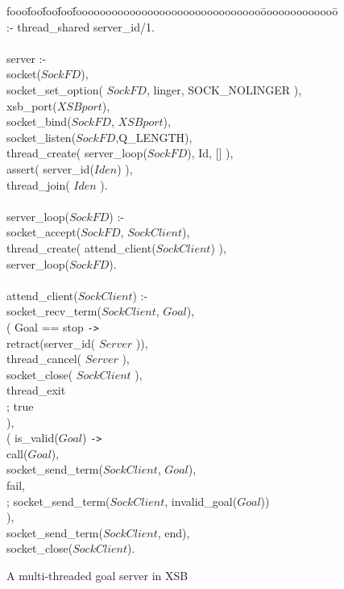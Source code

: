 \begin{figure}
\begin{center}
\begin{tt}
\begin{tabbing}
fooo\=foo\=foo\=foo\=fooooooooooooooooooooooooooooooo\=ooooooooooooo\=\kill
\> :- thread\_shared server\_id/1. \\
\\
\> server :-\\
\> \> socket($SockFD$),\\
\> \> socket\_set\_option( $SockFD$, linger, SOCK\_NOLINGER ),\\
\> \> xsb\_port($XSBport$),\\
\> \> socket\_bind($SockFD$, $XSBport$),\\
\> \> socket\_listen($SockFD$,Q\_LENGTH),\\
\> \> thread\_create( server\_loop($SockFD$), Id, [] ),\\
\> \> assert( server\_id($Iden$) ),\\
\> \> thread\_join( $Iden$ ).\\
\\
\> server\_loop($SockFD$) :-\\
\> \> socket\_accept($SockFD$, $SockClient$),\\
\> \> thread\_create( attend\_client($SockClient$) ),\\
\> \> server\_loop($SockFD$).\\
\\
\> attend\_client($SockClient$) :-\\
\> \> socket\_recv\_term($SockClient$, $Goal$),\\
\> \> ( \> Goal == stop \verb|->| \\
\> \> \> retract(server\_id( $Server$ )),\\
\> \> \> thread\_cancel( $Server$ ),\\
\> \> \> socket\_close( $SockClient$ ),\\
\> \> \> thread\_exit\\
\> \> ; \> true\\
\> \> ),\\
\> \> ( \> is\_valid($Goal$) \verb|->|\\
\> \> \> call($Goal$), \\
\> \> \> socket\_send\_term($SockClient$, $Goal$),\\
\> \> \> fail,\\
\> \> ;	\> socket\_send\_term($SockClient$, invalid\_goal($Goal$))\\
\> \> ),\\
\> \> socket\_send\_term($SockClient$, end),\\
\> \> socket\_close($SockClient$).
\end{tabbing}
\end{tt}
\end{center}
\caption{A multi-threaded goal server in XSB}
\label{fig:ex-server}
\end{figure}

